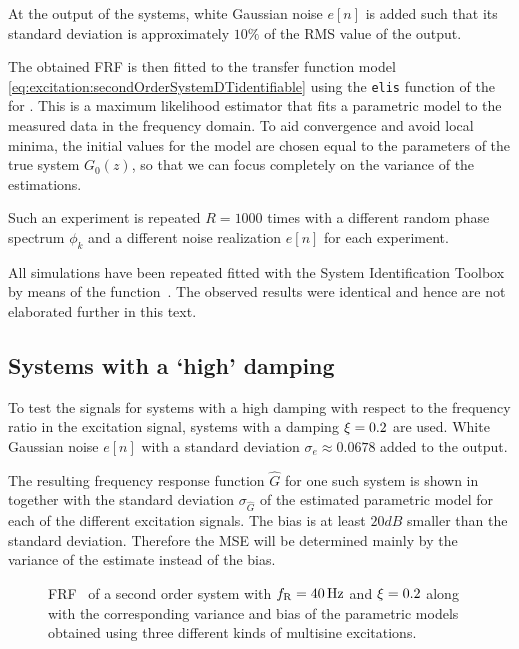   At the output of the systems, white Gaussian noise $e[n]$ is added such that its standard deviation is approximately $10\%$ of the RMS value of the output.

  
  The obtained FRF is then fitted to the transfer function model \eqref{eq:excitation:secondOrderSystemDTidentifiable} using the \texttt{elis} function of the \FDIDENT~\citep{FDIDENT} for \MATLAB.
  This is a maximum likelihood estimator that fits a parametric model to the measured data in the frequency domain.
  To aid convergence and avoid local minima, the initial values for the model are chosen equal to the parameters of the true system $G_0(z)$, so that we can focus completely on the variance of the estimations.

  Such an experiment is repeated $R=1000$ times with a different random phase  spectrum $\phi_k$ and a different noise realization $e[n]$ for each experiment.

  \begin{remark}
  All simulations  have been repeated fitted with the \MATLAB System Identification Toolbox by means of the  function~\citep{TDIDENT}.
  The observed results were identical and hence are not elaborated further in this text.
  \end{remark}

  \subsection{Systems with a `high' damping}
  To test the signals for systems with a high damping with respect to the frequency ratio in the excitation signal, systems with a damping $\xi = 0.2$ are used.
  White Gaussian noise $e[n]$ with a standard deviation $\sigma_e \approx 0.0678$ added to the output.

  The resulting frequency response function $\hat{G}$ for one such system is shown in  together with the standard deviation $\sigma_{\hat{G}}$ of the estimated parametric model for each of the different excitation signals.
  The bias is at least $20\unit{dB}$ smaller than the standard  deviation.
  Therefore the \gls{MSE} will be determined mainly by the variance of the estimate instead of the bias.

  \begin{figure}[th]
    \centering
      \setlength{}
      \setlength\figureheight{0.68\figurewidth}
    
    \caption[Simulated FRF and its variance for different excitation signals.]{\gls{FRF}~ of a second order system with $f_{\mathrm{R}}=40\,\mathrm{Hz}$ and $\xi=0.2$ along with the corresponding variance and bias of the parametric models obtained using three different kinds of multisine excitations.}%
    \label{fig:FRF1}
  \end{figure}

